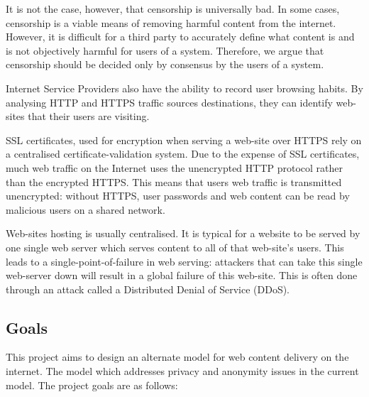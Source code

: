 \documentclass{article}
\begin{document}
It is not the case, however, that censorship is universally bad. In some cases, censorship is a viable means of removing harmful content from the internet. However, it is difficult for a third party to accurately define what content is and is not objectively harmful for users of a system. Therefore, we argue that censorship should be decided only by consensus by the users of a system.

Internet Service Providers also have the ability to record user browsing habits. By analysing HTTP and HTTPS traffic sources destinations, they can identify web-sites that their users are visiting.

SSL certificates, used for encryption when serving a web-site over HTTPS rely on a centralised certificate-validation system. Due to the expense of SSL certificates, much web traffic on the Internet uses the unencrypted HTTP protocol rather than the encrypted HTTPS. This means that users web traffic is transmitted unencrypted: without HTTPS, user passwords and web content can be read by malicious users on a shared network.

Web-sites hosting is usually centralised. It is typical for a website to be served by one single web server which serves content to all of that web-site’s users. This leads to a single-point-of-failure in web serving: attackers that can take this single web-server down will result in a global failure of this web-site. This is often done through an attack called a Distributed Denial of Service (DDoS).

\subsection{Goals}

This project aims to design an alternate model for web content delivery on the internet. The model  which addresses privacy and anonymity issues in the current model. The project goals are as follows:
\end{document}
